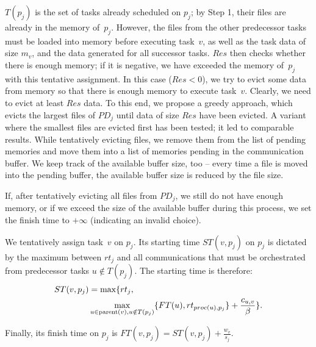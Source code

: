 \documentclass[conference]{IEEEtran}
\newcommand{\PD}{PD}
\newcommand{\AB}[1]{{\color{purple}[AB: #1]}}
\begin{document}
$T(p_j)$ is the set of tasks already scheduled on $p_j$; by Step 1, their files are
already in the memory of~$p_j$. However, the files from the
other predecessor tasks must be loaded into memory before executing task~$v$,
as well as the task data of size $m_v$, and the data generated for all successor tasks.
$Res$ then checks whether there is enough memory; if it is negative,
we have exceeded the memory of~$p_j$ with this tentative assignment.
%
In this case ($Res <0$), we try to evict some data from memory so that there is enough memory to execute task~$v$.
Clearly, we need to evict at least $Res$ data.
To this end, we propose a greedy approach, which evicts the largest files of $\PD_j$ until data of size $Res$ have been evicted. 
A variant where the smallest files are evicted first has been tested; it led to comparable results. 
%    
While tentatively evicting files, we remove them from the list of pending memories and move them into a list
of memories pending in the communication buffer.
We keep track of the available buffer size, too -- every time a file is moved into the pending buffer, 
the available buffer size is reduced by the file size.

If, after tentatively evicting all files from $\PD_j$, we still do not have enough memory, or if we exceed the size of the available buffer during this process, we set the finish time to $+\infty$ (indicating an invalid choice).


\smallskip
{} We tentatively assign task~$v$ on $p_j$.
Its starting time $ST(v, p_j)$ on $p_j$ is dictated by the maximum between $rt_j$ and all communications that
must be orchestrated from predecessor tasks $u\notin T(p_j)$.
The starting time is therefore:\\[-.7cm]

{\small{ \begin{align*}
ST(v, p_j) & = \max  \large\{rt_j,  \\
& \max_{ u \in \parent(v), u\notin T(p_j)}\{ FT(u) , rt_{proc(u), p_j}\} + \frac{c_{u,v}}{\beta} \Large\} . 
\end{align*}
}}

\noindent  Finally, its finish time on $p_j$ is 
$FT(v,p_j) = ST(v, p_j) + \frac{w_v}{s_j}$.
\end{document}
